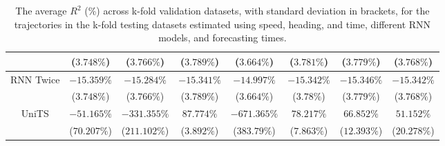 \begin{table}[!ht]
{\begin{tabular}{|c|c|c|c|c|c|c|c|}
			 & ($3.748\%$) & ($3.766\%$) & ($3.789\%$) & ($3.664\%$) & ($3.781\%$) & ($3.779\%$) & ($3.768\%$) \\ \hline
			\multirow{2}{*}{RNN Twice} & $-15.359\%$ & $-15.284\%$ & $-15.341\%$ & $-14.997\%$ & $-15.342\%$ & $-15.346\%$ & $-15.342\%$ \\
			 & ($3.748\%$) & ($3.766\%$) & ($3.789\%$) & ($3.664\%$) & ($3.78\%$) & ($3.779\%$) & ($3.768\%$) \\ \hline
			\multirow{2}{*}{UniTS} & $-51.165\%$ & $-331.355\%$ & $87.774\%$ & $-671.365\%$ & $78.217\%$ & $66.852\%$ & $51.152\%$ \\
			 & ($70.207\%$) & ($211.102\%$) & ($3.892\%$) & ($383.79\%$) & ($7.863\%$) & ($12.393\%$) & ($20.278\%$) \\ \hline
		\end{tabular}
	}
	\caption{The average $R^{2}$ (\%) across k-fold validation datasets, with standard deviation in brackets, for the trajectories in the k-fold testing datasets estimated using speed, heading, and time, different RNN models, and forecasting times.}
	\label{tab:all_speed_actual_dir_R2}
\end{table}

